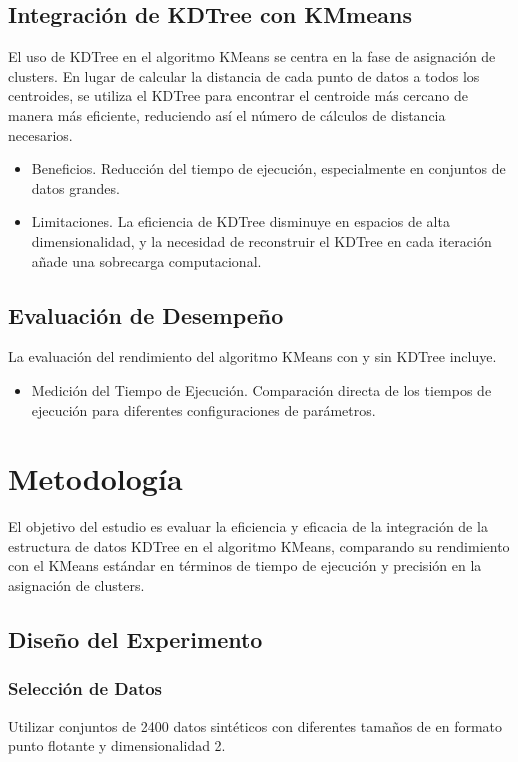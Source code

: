 \documentclass[conference]{IEEEtran}
\begin{document}
\subsection{Integración de KDTree con KMmeans}
El uso de KDTree en el algoritmo KMeans se centra en la fase de asignación de clusters. En lugar de calcular la distancia de cada punto de datos a todos los centroides, se utiliza el KDTree para encontrar el centroide más cercano de manera más eficiente, reduciendo así el número de cálculos de distancia necesarios.
\begin{itemize}
    \item{Beneficios.} Reducción del tiempo de ejecución, especialmente en conjuntos de datos grandes.
    \item{Limitaciones.} La eficiencia de KDTree disminuye en espacios de alta dimensionalidad, y la necesidad de reconstruir el KDTree en cada iteración añade una sobrecarga computacional.
\end{itemize}
\subsection{Evaluación de Desempeño}
La evaluación del rendimiento del algoritmo KMeans con y sin KDTree incluye.
\begin{itemize}
\item{Medición del Tiempo de Ejecución.} Comparación directa de los tiempos de ejecución para diferentes configuraciones de parámetros.
\end{itemize}

\section{Metodología}
El objetivo del estudio es evaluar la eficiencia y eficacia de la integración de la estructura de datos KDTree en el algoritmo KMeans, comparando su rendimiento con el KMeans estándar en términos de tiempo de ejecución y precisión en la asignación de clusters.

\subsection{Diseño del Experimento}
\subsubsection{Selección de Datos}
Utilizar conjuntos de 2400 datos sintéticos con diferentes tamaños de en formato punto flotante y dimensionalidad 2.
\end{document}
